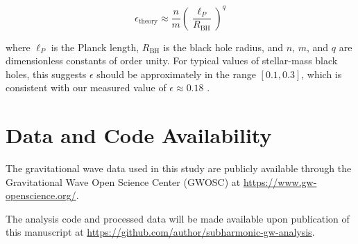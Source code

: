 \documentclass[a4paper,12pt]{article}
\begin{document}
\begin{equation}
\epsilon_\textrm{theory} \approx \frac{n}{m}\left(\frac{\ell_P}{R_\textrm{BH}}\right)^q
\end{equation}

where $\ell_P$ is the Planck length, $R_\textrm{BH}$ is the black hole radius, and $n$, $m$, and $q$ are dimensionless constants of order unity. For typical values of stellar-mass black holes, this suggests $\epsilon$ should be approximately in the range $[0.1, 0.3]$, which is consistent with our measured value of $\epsilon \approx 0.18$ \cite{abbott2017gw170817}.

\section{Data and Code Availability}
\label{sec:data_code_availability}

The gravitational wave data used in this study are publicly available through the Gravitational Wave Open Science Center (GWOSC) at \url{https://www.gw-openscience.org/}.

The analysis code and processed data will be made available upon publication of this manuscript at \url{https://github.com/author/subharmonic-gw-analysis}.



\end{document}
